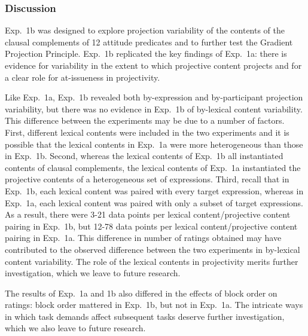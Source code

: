 \documentclass[11pt,fleqn]{article}
\newcommand{\6}{\mbox{$[\hspace*{-.6mm}[$}}
\newcommand{\9}{\mbox{$]\hspace*{-.6mm}]$}}
\begin{document}
%
%
%
%


\subsubsection{Discussion}

Exp.~1b was designed to explore projection variability of the contents of the clausal complements of 12 attitude predicates and to further test the Gradient Projection Principle. Exp.~1b replicated the key findings of Exp.~1a: there is evidence for variability in the extent to which projective content projects and for a clear role for at-issueness in projectivity.

Like Exp.~1a, Exp.~1b revealed both by-expression and by-participant projection variability, but there was no evidence in Exp.~1b of by-lexical content variability. This difference between the experiments may be due to a number of factors. First, different lexical contents were included in the two experiments and it is possible that the lexical contents in Exp.~1a were more heterogeneous than those in Exp.~1b. Second, whereas the lexical contents of Exp.~1b all instantiated contents of clausal complements, the lexical contents of Exp.~1a instantiated the projective contents of a heterogeneous set of expressions. Third, recall that in Exp.~1b, each lexical content was paired with every target expression, whereas in Exp.~1a, each lexical content was paired with only a subset of target expressions. As a result, there were 3-21 data points per lexical content/projective content pairing in Exp.~1b, but 12-78 data points per lexical content/projective content pairing in Exp.~1a. This difference in number of ratings obtained may have contributed to the observed difference between the two experiments in by-lexical content variability. The role of the lexical contents in projectivity merits further investigation, which we leave to future research. 

The results of Exp.~1a and 1b also differed in the effects of block order on ratings: block order mattered in Exp.~1b, but not in Exp.~1a. The intricate ways in which task demands affect subsequent tasks deserve further investigation, which we also leave to future research.
\end{document}
